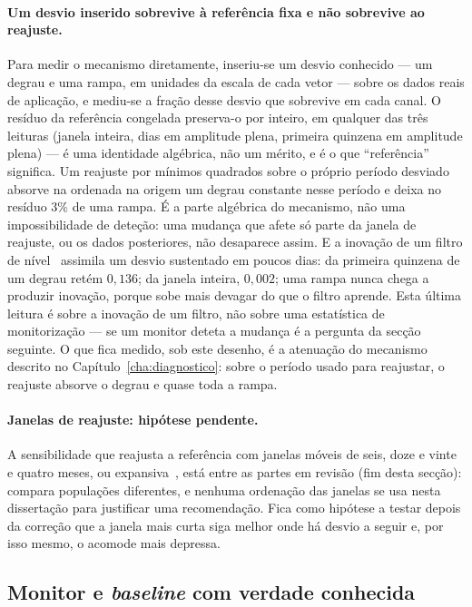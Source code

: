 \paragraph{Um desvio inserido sobrevive à referência fixa e não sobrevive ao
reajuste.} Para medir o mecanismo diretamente, inseriu-se um desvio
conhecido --- um degrau e uma rampa, em unidades da escala de cada vetor
--- sobre os dados reais de aplicação, e mediu-se a fração desse desvio que
sobrevive em cada canal. O resíduo da referência congelada preserva-o por
inteiro, em qualquer das três leituras (janela inteira, dias em amplitude
plena, primeira quinzena em amplitude plena) --- é uma identidade algébrica,
não um mérito, e é o que ``referência'' significa. Um reajuste por mínimos quadrados
sobre o próprio período desviado absorve na ordenada na origem um degrau
constante nesse período e deixa no resíduo $3\%$ de uma rampa. É a parte
algébrica do mecanismo, não uma impossibilidade de deteção: uma mudança que
afete só parte da janela de reajuste, ou os dados posteriores, não
desaparece assim. E a inovação de um filtro de nível~\cite{DurbinKoopman2012} assimila um
desvio sustentado em poucos dias: da primeira quinzena de um degrau retém
$0{,}136$; da janela inteira, $0{,}002$; uma rampa nunca chega a produzir
inovação, porque sobe mais devagar do que o filtro aprende. Esta última
leitura é sobre a inovação de um filtro, não sobre uma estatística de
monitorização --- se um monitor deteta a mudança é a pergunta da secção
seguinte. O que fica medido, sob este desenho, é a atenuação do
mecanismo descrito no Capítulo~\ref{cha:diagnostico}: sobre o período usado
para reajustar, o reajuste absorve o degrau e quase toda a rampa.

\paragraph{Janelas de reajuste: hipótese pendente.} A sensibilidade que
reajusta a referência com janelas móveis de seis, doze e vinte e quatro
meses, ou expansiva~\cite{PesaranTimmermann2007}, está entre as partes em
revisão (fim desta secção): compara populações diferentes, e nenhuma
ordenação das janelas se usa nesta dissertação para justificar uma
recomendação. Fica como hipótese a testar depois da correção que a janela
mais curta siga melhor onde há desvio a seguir e, por isso mesmo, o
acomode mais depressa.

\subsection{Monitor e \emph{baseline} com verdade conhecida}
\label{sec:verdade-conhecida}

